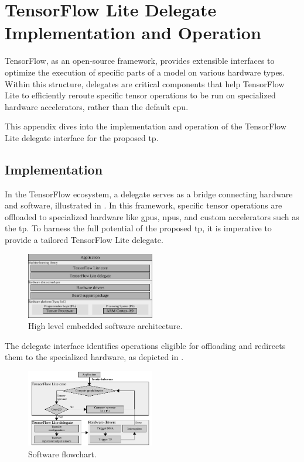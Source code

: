\section{TensorFlow Lite Delegate Implementation and Operation}

TensorFlow, as an open-source framework, provides extensible interfaces to optimize the execution of specific parts of a model on various hardware types. Within this structure, delegates are critical components that help TensorFlow Lite to efficiently reroute specific tensor operations to be run on specialized hardware accelerators, rather than the default \gls{cpu}.

This appendix dives into the implementation and operation of the TensorFlow Lite delegate interface for the proposed \gls{tp}.

\subsection{Implementation}

In the TensorFlow ecosystem, a delegate serves as a bridge connecting hardware and software, illustrated in . In this framework, specific tensor operations are offloaded to specialized hardware like \glspl{gpu}, \glspl{npu}, and custom accelerators such as the \gls{tp}. To harness the full potential of the proposed \gls{tp}, it is imperative to provide a tailored TensorFlow Lite delegate.

\begin{figure}[h!]
	\centering
	\includegraphics[width=0.5\textwidth]{./chapters/cnn_accelerator/figures/sw_stack.pdf}
	\caption{High level embedded software architecture.}
	\label{fig:sw_stack_appendix}
\end{figure}

The delegate interface identifies operations eligible for offloading and redirects them to the specialized hardware, as depicted in .

\begin{figure}[h!]
	\centering
	\includegraphics[width=0.5\textwidth]{./chapters/cnn_accelerator/figures/sw_stack_flowchart.pdf}
	\caption{Software flowchart.}
	\label{fig:sw_stack_flowchart_apendix}
\end{figure}


